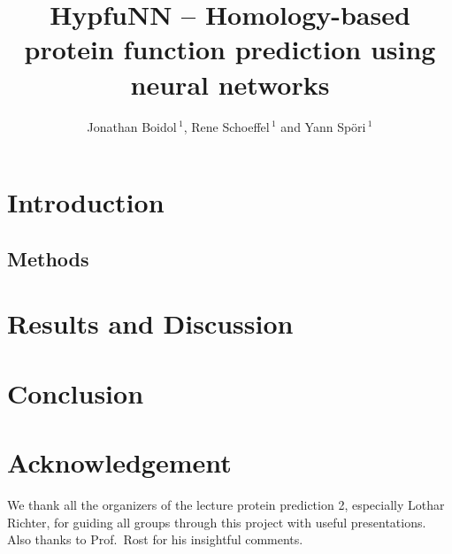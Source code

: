\documentclass{bioinfo}
\begin{document}

\title[Homology-based function prediction]{HypfuNN -- Homology-based protein function prediction using neural networks}
\author[]{Jonathan Boidol\,$^{1}$, Rene Schoeffel\,$^{1}$ and Yann Sp\"ori\,$^{1}$}
\address{$^{1}$TUM (Technische Universit\"at M\"unchen) Department of Informatics, Bioinformatics \& Computational Biology - i12, Boltzmannstr.~3, 85748 Garching/Munich, Germany}
\history{}

\editor{}

\maketitle



\section{Introduction}



\begin{methods}
\section{Methods}



\end{methods}
\section{Results and Discussion}



\section{Conclusion}




\section*{Acknowledgement}
We thank all the organizers of the lecture protein prediction 2, especially Lothar Richter, for guiding all groups through this project with useful presentations. Also thanks to Prof.~Rost for his insightful
comments.



\end{document}
